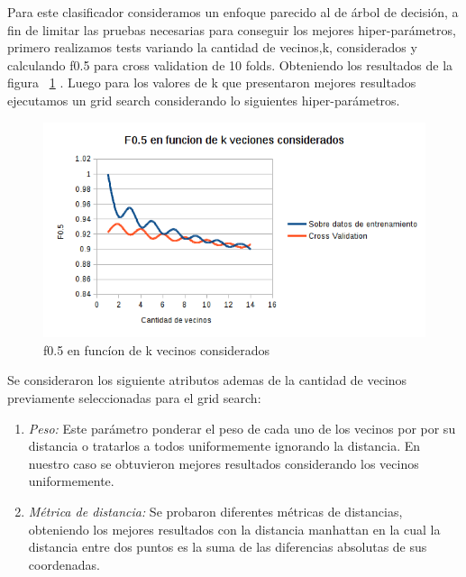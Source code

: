 Para este clasificador consideramos un enfoque parecido al de árbol de decisión, a fin de limitar las pruebas necesarias para conseguir los mejores hiper-parámetros, primero realizamos tests variando la cantidad de vecinos,k, considerados y calculando f0.5 para cross validation de 10 folds. Obteniendo los resultados de la figura ~\ref{fig:knn_f05_en_funcion_vecinos} .
Luego para los valores de k que presentaron mejores resultados ejecutamos un grid search considerando lo siguientes hiper-parámetros. 
\begin{figure}[H]
    \centering
        \includegraphics[width=\textwidth]{plots/knn_f05_en_funcion_vecinos.png}
        \caption{f0.5 en funcíon de k vecinos considerados}
        \label{fig:knn_f05_en_funcion_vecinos}
\end{figure}
    Se consideraron los siguiente atributos ademas de la cantidad de vecinos previamente seleccionadas para el grid search:
 \begin{enumerate}
\item \textit{Peso:} Este parámetro ponderar el peso de cada uno de los vecinos por por su distancia o tratarlos a todos uniformemente ignorando la distancia. En nuestro caso se obtuvieron mejores resultados considerando los vecinos uniformemente.  
\item \textit{Métrica de distancia:} Se probaron diferentes métricas de distancias, obteniendo los mejores resultados con la distancia manhattan en la cual la distancia entre dos puntos es la suma de las diferencias absolutas de sus coordenadas.
\end{enumerate}
